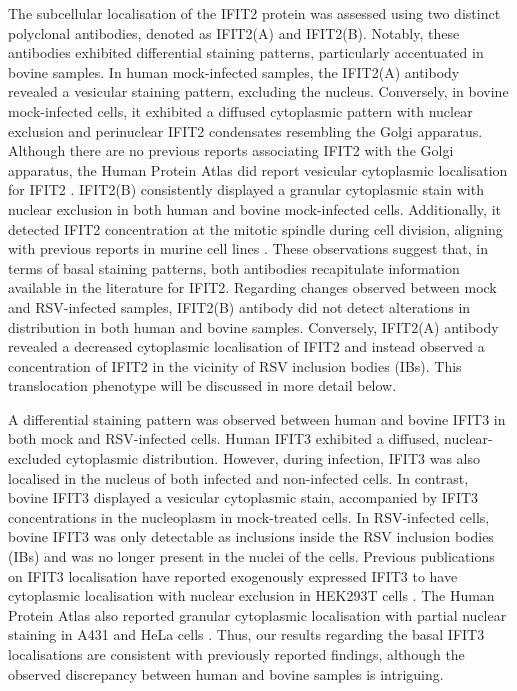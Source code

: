 The subcellular localisation of the IFIT2 protein was assessed using two distinct polyclonal antibodies, denoted as IFIT2(A) and IFIT2(B). Notably, these antibodies exhibited differential staining patterns, particularly accentuated in bovine samples. In human mock-infected samples, the IFIT2(A) antibody revealed a vesicular staining pattern, excluding the nucleus. Conversely, in bovine mock-infected cells, it exhibited a diffused cytoplasmic pattern with nuclear exclusion and perinuclear IFIT2 condensates resembling the Golgi apparatus. Although there are no previous reports associating IFIT2 with the Golgi apparatus, the Human Protein Atlas did report vesicular cytoplasmic localisation for IFIT2 \cite{Thul2017AProteome}. IFIT2(B) consistently displayed a granular cytoplasmic stain with nuclear exclusion in both human and bovine mock-infected cells. Additionally, it detected IFIT2 concentration at the mitotic spindle during cell division, aligning with previous reports in murine cell lines \cite{Saha2006IdentificationProtein}. These observations suggest that, in terms of basal staining patterns, both antibodies recapitulate information available in the literature for IFIT2. Regarding changes observed between mock and RSV-infected samples, IFIT2(B) antibody did not detect alterations in distribution in both human and bovine samples. Conversely, IFIT2(A) antibody revealed a decreased cytoplasmic localisation of IFIT2 and instead observed a concentration of IFIT2 in the vicinity of RSV inclusion bodies (IBs). This translocation phenotype will be discussed in more detail below.

A differential staining pattern was observed between human and bovine IFIT3 in both mock and RSV-infected cells. Human IFIT3 exhibited a diffused, nuclear-excluded cytoplasmic distribution. However, during infection, IFIT3 was also localised in the nucleus of both infected and non-infected cells. In contrast, bovine IFIT3 displayed a vesicular cytoplasmic stain, accompanied by IFIT3 concentrations in the nucleoplasm in mock-treated cells. In RSV-infected cells, bovine IFIT3 was only detectable as inclusions inside the RSV inclusion bodies (IBs) and was no longer present in the nuclei of the cells. Previous publications on IFIT3 localisation have reported exogenously expressed IFIT3 to have cytoplasmic localisation with nuclear exclusion in HEK293T cells \cite{Huang2008Interferon-inducedCells, Liu2011IFN-InducedTBK1}. The Human Protein Atlas also reported granular cytoplasmic localisation with partial nuclear staining in A431 and HeLa cells \cite{Thul2017AProteome}. Thus, our results regarding the basal IFIT3 localisations are consistent with previously reported findings, although the observed discrepancy between human and bovine samples is intriguing.

